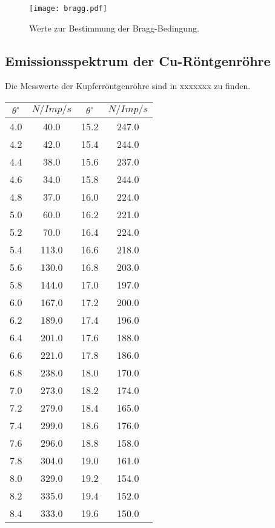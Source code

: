 \begin{figure}
  \centering
  \texttt{[image: bragg.pdf]}
  \caption{Werte zur Bestimmung der Bragg-Bedingung.}
  \label{fig:bragg}
\end{figure}

\subsection{Emissionsspektrum der Cu-Röntgenröhre}
\label{sec:cu}

Die Messwerte der Kupferröntgenröhre sind in xxxxxxx zu finden.

\begin{table}
  \centering
  \begin{tabular}{c c | c c}
    \toprule
    $\theta^{\circ}$ & $N/Imp/s$ & $\theta^{\circ}$ & $N/Imp/s$ \\
    \midrule
     4.0 &  40.0 & 15.2 &  247.0 \\
     4.2 &  42.0 & 15.4 &  244.0 \\
     4.4 &  38.0 & 15.6 &  237.0 \\
     4.6 &  34.0 & 15.8 &  244.0 \\
     4.8 &  37.0 & 16.0 &  224.0 \\
     5.0 &  60.0 & 16.2 &  221.0 \\
     5.2 &  70.0 & 16.4 &  224.0 \\
     5.4 & 113.0 & 16.6 &  218.0 \\
     5.6 & 130.0 & 16.8 &  203.0 \\
     5.8 & 144.0 & 17.0 &  197.0 \\
     6.0 & 167.0 & 17.2 &  200.0 \\
     6.2 & 189.0 & 17.4 &  196.0 \\
     6.4 & 201.0 & 17.6 &  188.0 \\
     6.6 & 221.0 & 17.8 &  186.0 \\
     6.8 & 238.0 & 18.0 &  170.0 \\
     7.0 & 273.0 & 18.2 &  174.0 \\
     7.2 & 279.0 & 18.4 &  165.0 \\
     7.4 & 299.0 & 18.6 &  176.0 \\
     7.6 & 296.0 & 18.8 &  158.0 \\
     7.8 & 304.0 & 19.0 &  161.0 \\
     8.0 & 329.0 & 19.2 &  154.0 \\
     8.2 & 335.0 & 19.4 &  152.0 \\
     8.4 & 333.0 & 19.6 &  150.0 \\

\end{tabular}
\end{table}
